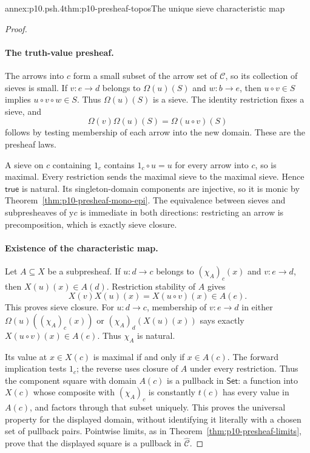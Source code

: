 \begin{annexitem}{annex:p10.psh.4}{thm:p10-presheaf-topos}{The unique sieve characteristic map}
\begin{proof}
\paragraph{The truth-value presheaf.}
The arrows into \(c\) form a small subset of the arrow set of
\(\mathcal C\), so its collection of sieves is small.
If \(v:e\to d\) belongs to \(\Omega(u)(S)\) and \(w:b\to e\),
then \(u\circ v\in S\) implies \(u\circ v\circ w\in S\).
Thus \(\Omega(u)(S)\) is a sieve.
The identity restriction fixes a sieve, and
\[
                      \Omega(v)\Omega(u)(S)=\Omega(u\circ v)(S)
\]
follows by testing membership of each arrow into the new domain.
These are the presheaf laws.

A sieve on \(c\) containing \(1_c\) contains
\(1_c\circ u=u\) for every arrow into \(c\), so is maximal.
Every restriction sends the maximal sieve to the maximal sieve.
Hence \(\mathsf{true}\) is natural.
Its singleton-domain components are injective, so it is monic by
Theorem~\ref{thm:p10-presheaf-mono-epi}.
The equivalence between sieves and subpresheaves of \(\mathrm y c\)
is immediate in both directions: restricting an arrow is
precomposition, which is exactly sieve closure.

\paragraph{Existence of the characteristic map.}
Let \(A\subseteq X\) be a subpresheaf.
If \(u:d\to c\) belongs to \((\chi_A)_c(x)\) and \(v:e\to d\),
then \(X(u)(x)\in A(d)\).  Restriction stability of \(A\) gives
\[
                      X(v)X(u)(x)=X(u\circ v)(x)\in A(e).
\]
This proves sieve closure.
For \(u:d\to c\), membership of \(v:e\to d\) in either
\(\Omega(u)((\chi_A)_c(x))\) or
\((\chi_A)_d(X(u)(x))\) says exactly
\(X(u\circ v)(x)\in A(e)\).
Thus \(\chi_A\) is natural.

Its value at \(x\in X(c)\) is maximal if and only if
\(x\in A(c)\).  The forward implication tests \(1_c\);
the reverse uses closure of \(A\) under every restriction.
Thus the component square with domain \(A(c)\) is a pullback
in \(\mathsf{Set}\): a function into \(X(c)\) whose composite
with \((\chi_A)_c\) is constantly \(t(c)\) has every value
in \(A(c)\), and factors through that subset uniquely.
This proves the universal property for the displayed domain,
without identifying it literally with a chosen set of pullback
pairs.  Pointwise limits, as in
Theorem~\ref{thm:p10-presheaf-limits}, prove that the displayed
square is a pullback in \(\widehat{\mathcal C}\).


\end{proof}
\end{annexitem}
